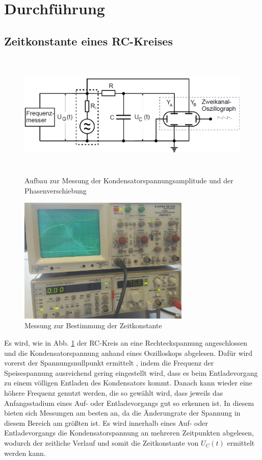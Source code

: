 \section{Durchführung}
\label{sec:Durchführung}

\subsection{Zeitkonstante eines RC-Kreises}

\begin{figure}
    \centering
    \includegraphics[height=6cm]{data/bild_4}
    \caption{Aufbau zur Messung der Kondensatorspannungsamplitude und der Phasenverschiebung}
    \label{fig:bild_4}
\end{figure}

\begin{figure}
    \centering
    \includegraphics[height=6cm]{data/a_zeitkonstante}
    \caption{Messung zur Bestimmung der Zeitkonstante}
    \label{fig:a_zeit}
\end{figure}

Es wird, wie in Abb. \ref{fig:bild_4} der RC-Kreis an eine Rechteckspannung angeschlossen und die Kondensatorspannung 
anhand eines Oszilloskops abgelesen. Dafür wird vorerst der Spannungsnullpunkt ermittelt , indem die Frequenz der 
Speisespannung ausreichend gering eingestellt wird, dass es beim Entladevorgang zu einem völligen Entladen des Kondensators kommt. 
Danach kann wieder eine höhere Frequenz genutzt werden, die so gewählt wird, dass jeweils das Anfangsstadium eines Auf- oder 
Entladevorgangs gut so erkennen ist. In diesem bieten sich Messungen am besten an, da die Änderungrate der Spannung in diesem 
Bereich am größten ist.
Es wird innerhalb eines Auf- oder Entladevorgangs die Kondensatorspannung an mehreren Zeitpunkten abgelesen, wodurch der zeitliche 
Verlauf und somit die Zeitkonstante von $U_C (t)$ ermittelt werden kann.

